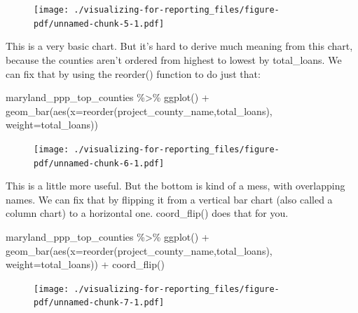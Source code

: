 \documentclass[
  letterpaper,
  DIV=11,
  numbers=noendperiod]{scrreprt}
\newenvironment{Shaded}{\begin{snugshade}}{\end{snugshade}}
\newcommand{\AttributeTok}[1]{\textcolor[rgb]{0.40,0.45,0.13}{#1}}
\newcommand{\FunctionTok}[1]{\textcolor[rgb]{0.28,0.35,0.67}{#1}}
\newcommand{\NormalTok}[1]{\textcolor[rgb]{0.00,0.23,0.31}{#1}}
\newcommand{\SpecialCharTok}[1]{\textcolor[rgb]{0.37,0.37,0.37}{#1}}
\begin{document}
\begin{figure}[H]

{\centering \texttt{[image: ./visualizing-for-reporting\_files/figure-pdf/unnamed-chunk-5-1.pdf]}

}

\end{figure}

This is a very basic chart. But it's hard to derive much meaning from
this chart, because the counties aren't ordered from highest to lowest
by total\_loans. We can fix that by using the reorder() function to do
just that:

\begin{Shaded}
\begin{Highlighting}[]
\NormalTok{maryland\_ppp\_top\_counties }\SpecialCharTok{\%\textgreater{}\%}
  \FunctionTok{ggplot}\NormalTok{() }\SpecialCharTok{+}
  \FunctionTok{geom\_bar}\NormalTok{(}\FunctionTok{aes}\NormalTok{(}\AttributeTok{x=}\FunctionTok{reorder}\NormalTok{(project\_county\_name,total\_loans), }\AttributeTok{weight=}\NormalTok{total\_loans))}
\end{Highlighting}
\end{Shaded}

\begin{figure}[H]

{\centering \texttt{[image: ./visualizing-for-reporting\_files/figure-pdf/unnamed-chunk-6-1.pdf]}

}

\end{figure}

This is a little more useful. But the bottom is kind of a mess, with
overlapping names. We can fix that by flipping it from a vertical bar
chart (also called a column chart) to a horizontal one. coord\_flip()
does that for you.

\begin{Shaded}
\begin{Highlighting}[]
\NormalTok{maryland\_ppp\_top\_counties }\SpecialCharTok{\%\textgreater{}\%}
  \FunctionTok{ggplot}\NormalTok{() }\SpecialCharTok{+}
  \FunctionTok{geom\_bar}\NormalTok{(}\FunctionTok{aes}\NormalTok{(}\AttributeTok{x=}\FunctionTok{reorder}\NormalTok{(project\_county\_name,total\_loans), }\AttributeTok{weight=}\NormalTok{total\_loans)) }\SpecialCharTok{+}
  \FunctionTok{coord\_flip}\NormalTok{()}
\end{Highlighting}
\end{Shaded}

\begin{figure}[H]

{\centering \texttt{[image: ./visualizing-for-reporting\_files/figure-pdf/unnamed-chunk-7-1.pdf]}

}

\end{figure}
\end{document}
